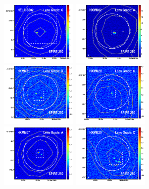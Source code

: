 \documentclass[iop]{emulateapj}
\begin{document}
\begin{figure}[!tbp] 
    \begin{centering}
\includegraphics[width=0.331\textwidth]{HELAISS02_870_250.pdf}
\includegraphics[width=0.331\textwidth]{HXMM02_870_250.pdf}
\includegraphics[width=0.331\textwidth]{HXMM31_870_250.pdf}
\includegraphics[width=0.331\textwidth]{HXMM29_870_250.pdf}
\includegraphics[width=0.331\textwidth]{HXMM07_870_250.pdf}
\includegraphics[width=0.331\textwidth]{HXMM20_870_250.pdf}

\end{centering}
\end{figure}
\end{document}
